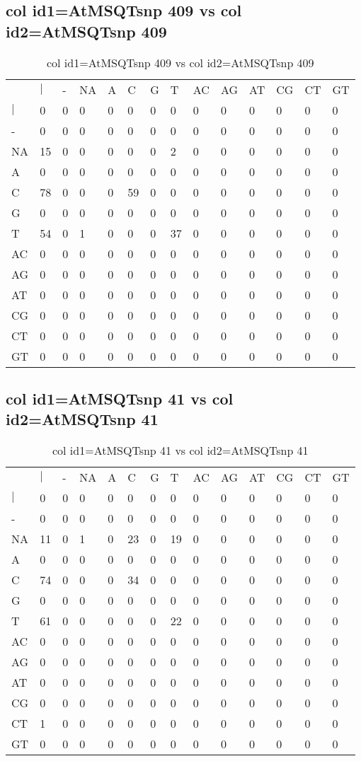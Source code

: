 \subsection{col id1=AtMSQTsnp 409 vs col id2=AtMSQTsnp 409}
\begin{center}
\begin{longtable}{|l|l|l|l|l|l|l|l|l|l|l|l|l|l|}
\caption{col id1=AtMSQTsnp 409 vs col id2=AtMSQTsnp 409} \label{table_dm732}\\
\hline
\\
\hline
&$|$&-&NA&A&C&G&T&AC&AG&AT&CG&CT&GT\\
$|$&0&0&0&0&0&0&0&0&0&0&0&0&0\\
-&0&0&0&0&0&0&0&0&0&0&0&0&0\\
NA&15&0&0&0&0&0&2&0&0&0&0&0&0\\
A&0&0&0&0&0&0&0&0&0&0&0&0&0\\
C&78&0&0&0&59&0&0&0&0&0&0&0&0\\
G&0&0&0&0&0&0&0&0&0&0&0&0&0\\
T&54&0&1&0&0&0&37&0&0&0&0&0&0\\
AC&0&0&0&0&0&0&0&0&0&0&0&0&0\\
AG&0&0&0&0&0&0&0&0&0&0&0&0&0\\
AT&0&0&0&0&0&0&0&0&0&0&0&0&0\\
CG&0&0&0&0&0&0&0&0&0&0&0&0&0\\
CT&0&0&0&0&0&0&0&0&0&0&0&0&0\\
GT&0&0&0&0&0&0&0&0&0&0&0&0&0\\
\hline
\end{longtable}
\end{center}

\subsection{col id1=AtMSQTsnp 41 vs col id2=AtMSQTsnp 41}
\begin{center}
\begin{longtable}{|l|l|l|l|l|l|l|l|l|l|l|l|l|l|}
\caption{col id1=AtMSQTsnp 41 vs col id2=AtMSQTsnp 41} \label{table_dm734}\\
\hline
\\
\hline
&$|$&-&NA&A&C&G&T&AC&AG&AT&CG&CT&GT\\
$|$&0&0&0&0&0&0&0&0&0&0&0&0&0\\
-&0&0&0&0&0&0&0&0&0&0&0&0&0\\
NA&11&0&1&0&23&0&19&0&0&0&0&0&0\\
A&0&0&0&0&0&0&0&0&0&0&0&0&0\\
C&74&0&0&0&34&0&0&0&0&0&0&0&0\\
G&0&0&0&0&0&0&0&0&0&0&0&0&0\\
T&61&0&0&0&0&0&22&0&0&0&0&0&0\\
AC&0&0&0&0&0&0&0&0&0&0&0&0&0\\
AG&0&0&0&0&0&0&0&0&0&0&0&0&0\\
AT&0&0&0&0&0&0&0&0&0&0&0&0&0\\
CG&0&0&0&0&0&0&0&0&0&0&0&0&0\\
CT&1&0&0&0&0&0&0&0&0&0&0&0&0\\
GT&0&0&0&0&0&0&0&0&0&0&0&0&0\\
\hline
\end{longtable}
\end{center}

